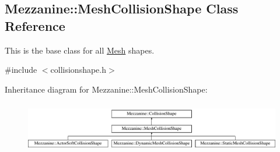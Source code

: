 \hypertarget{classMezzanine_1_1MeshCollisionShape}{
\subsection{Mezzanine::MeshCollisionShape Class Reference}
\label{classMezzanine_1_1MeshCollisionShape}
}


This is the base class for all \hyperlink{classMezzanine_1_1Mesh}{Mesh} shapes.  




{\ttfamily \#include $<$collisionshape.h$>$}

Inheritance diagram for Mezzanine::MeshCollisionShape:\begin{figure}[H]
\begin{center}
\leavevmode
\includegraphics[height=2.231076cm]{classMezzanine_1_1MeshCollisionShape}
\end{center}
\end{figure}
